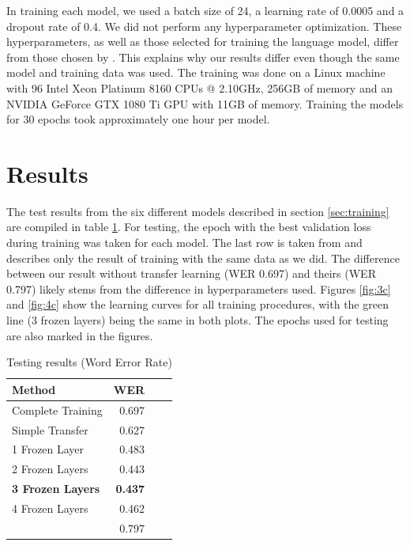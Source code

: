 \documentclass[12pt]{article}    %
\begin{document}
In training each model, we used a batch size of 24, a learning rate of 0.0005 and a dropout rate of 0.4. We did not perform any hyperparameter optimization. These hyperparameters, as well as those selected for training the language model, differ from those chosen by \textcite{agarwal-zesch-2019-german}. This explains why our results differ even though the same model and training data was used. The training was done on a Linux machine with 96 Intel Xeon Platinum 8160 CPUs @ 2.10GHz, 256GB of memory and an NVIDIA GeForce GTX 1080 Ti GPU with 11GB of memory. Training the models for 30 epochs took approximately one hour per model.

\section{Results}
The test results from the six different models described in section \ref{sec:training} are compiled in table \ref{tab:results}. For testing, the epoch with the best validation loss during training was taken for each model. The last row is taken from \textcite[Table~3]{agarwal-zesch-2019-german} and describes only the result of training with the same data as we did. The difference between our result without transfer learning (WER 0.697) and theirs (WER 0.797) likely stems from the difference in hyperparameters used. Figures \ref{fig:3c} and \ref{fig:4c} show the learning curves for all training procedures, with the green line (3 frozen layers) being the same in both plots. The epochs used for testing are also marked in the figures.

\begin{table}[ht]
    \centering
    \vspace{5mm}
    \begin{tabular}{lrrr}
        \toprule
        Method & WER \\
        \midrule
        Complete Training & 0.697 \\
        Simple Transfer & 0.627 \\
        1 Frozen Layer & 0.483 \\
        2 Frozen Layers & 0.443 \\
        \textbf{3 Frozen Layers} & \textbf{0.437} \\
        4 Frozen Layers & 0.462 \\
        \cite{agarwal-zesch-2019-german} & 0.797 \\
        \bottomrule
    \end{tabular}
    \caption{Testing results (Word Error Rate)}
    \label{tab:results}
\end{table}
\end{document}
